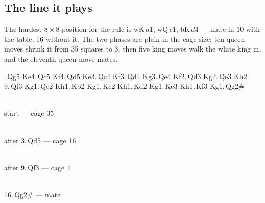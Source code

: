 \documentclass[11pt]{article}
\begin{document}
\subsection{The line it plays}\label{sub:rule-line}

The hardest $8\times8$ position for the rule is wK\,$a1$, wQ\,$c1$,
bK\,$d4$ --- mate in 10 with the table, 16 without it. The two phases are
plain in the cage size: ten queen moves shrink it from 35 squares to 3, then
five king moves walk the white king in, and the eleventh queen move mates.

\begin{center}\small{}.\,Qg5 Ke4.\,Qc5 Kf4.\,Qd5 Ke3.\,Qc4 Kf3.\,Qd4 Kg3.\,Qe4 Kf2.\,Qd3 Kg2.\,Qe3 Kh2\\
9.\,Qf3 Kg1.\,Qe2 Kh1.\,Kb2 Kg1.\,Kc2 Kh1.\,Kd2 Kg1.\,Ke3 Kh1.\,Kf3 Kg1.\,Qg2\#
\end{center}

\begin{center}
\begin{minipage}{0.235\textwidth}\centering
  \\[1.2mm]
  {\small\color{kqk}start --- cage 35}
\end{minipage}\hfill
\begin{minipage}{0.235\textwidth}\centering
  \\[1.2mm]
  {\small\color{kqk}after 3.\,Qd5 --- cage 16}
\end{minipage}\hfill
\begin{minipage}{0.235\textwidth}\centering
  \\[1.2mm]
  {\small\color{kqk}after 9.\,Qf3 --- cage 4}
\end{minipage}\hfill
\begin{minipage}{0.235\textwidth}\centering
  \\[1.2mm]
  {\small\color{kqk}16.\,Qg2\# --- mate}
\end{minipage}
\end{center}

\end{document}
